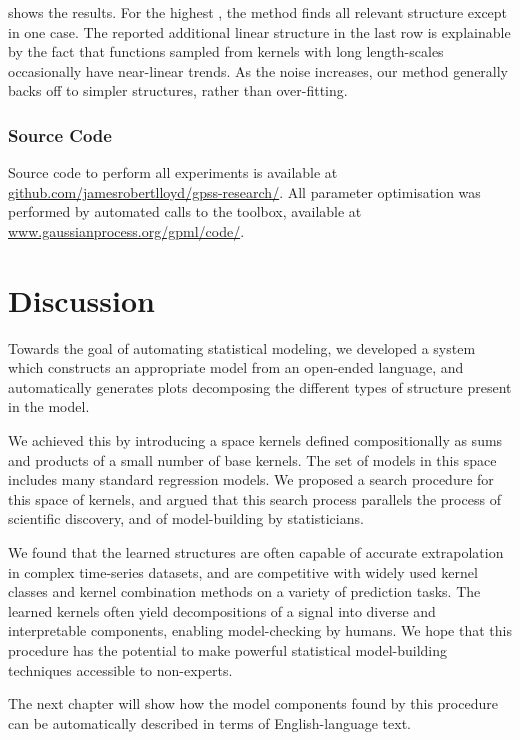  shows the results.
For the highest \SNR{}, the method finds all relevant structure except in one case.
The reported additional linear structure in the last row is explainable by the fact that functions sampled from \kSE{} kernels with long length-scales occasionally have near-linear trends.
As the noise increases, our method generally backs off to simpler structures, rather than over-fitting.

\subsubsection{Source Code}
Source code to perform all experiments is available at \url{github.com/jamesrobertlloyd/gpss-research/}. 
All \gp{} parameter optimisation was performed by automated calls to the \GPML{} toolbox, available at \url{www.gaussianprocess.org/gpml/code/}.


\section{Discussion}

Towards the goal of automating statistical modeling, we developed a system which constructs an appropriate model from an open-ended language, and automatically generates plots decomposing the different types of structure present in the model.

We achieved this by introducing a space kernels defined compositionally as sums and products of a small number of base kernels.  
The set of models in this space includes many standard regression models.
We proposed a search procedure for this space of kernels, and argued that this search process parallels the process of scientific discovery, and of model-building by statisticians.

We found that the learned structures are often capable of accurate extrapolation in complex time-series datasets, and are competitive with widely used kernel classes and kernel combination methods on a variety of prediction tasks.
The learned kernels often yield decompositions of a signal into diverse and interpretable components, enabling model-checking by humans.
We hope that this procedure has the potential to make powerful statistical model-building techniques accessible to non-experts.

The next chapter will show how the model components found by this procedure can be automatically described in terms of English-language text.

\iffalse
